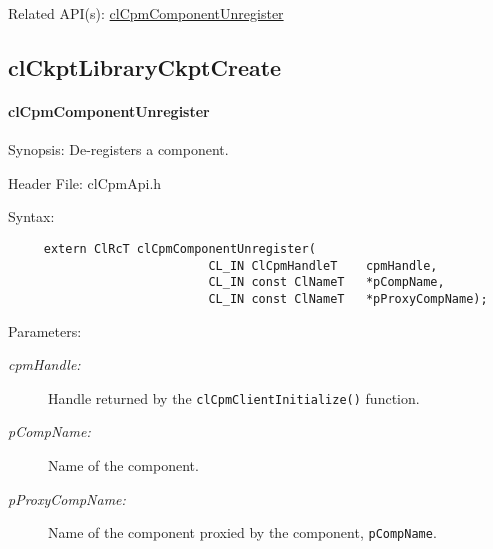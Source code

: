 {\begin{Desc}
\item[Related API(s):]\hyperlink{group__group14}{cl\-Cpm\-Component\-Unregister} \end{Desc}
\newpage




\subsection{clCkptLibraryCkptCreate}
\hypertarget{pagecpm113}{}\paragraph{cl\-Cpm\-Component\-Unregister}\label{pagecpm113}
\begin{Desc}
\item[Synopsis:]De-registers a component.\end{Desc}
\begin{Desc}
\item[Header File:]clCpmApi.h\end{Desc}
\begin{Desc}
\item[Syntax:]

\footnotesize\begin{verbatim}     extern ClRcT clCpmComponentUnregister(
                			CL_IN ClCpmHandleT    cpmHandle,
                			CL_IN const ClNameT   *pCompName,
                			CL_IN const ClNameT   *pProxyCompName);
\end{verbatim}
\normalsize
\end{Desc}
\begin{Desc}
\item[Parameters:]
\begin{description}
\item[{\em cpm\-Handle:}]Handle returned by the {\tt{cl\-Cpm\-Client\-Initialize()}} function. 
\item[{\em p\-Comp\-Name:}]Name of the component. 
\item[{\em p\-Proxy\-Comp\-Name:}]Name of the component proxied by the component, {\tt{p\-Comp\-Name}}.
\end{description}
\end{Desc}

}
